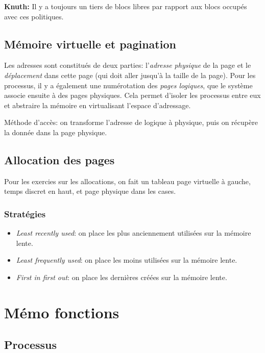 \documentclass[a4paper]{article}
\begin{document}
\begin{multicols*}{2}
    \textbf{Knuth:} Il y a toujours un tiers de blocs libres par rapport aux blocs occupés avec ces politiques.

    \subsection{Mémoire virtuelle et pagination}

    Les adresses sont constitués de deux parties: l'\emph{adresse physique} de la page et le \emph{déplacement} dans cette page (qui doit aller jusqu'à la taille de la page).
    Pour les processus, il y a également une numérotation des \emph{pages logiques}, que le système associe ensuite à des pages physiques. Cela permet d'isoler les processus entre eux et abstraire la mémoire en virtualisant l'espace d'adressage.

    Méthode d'accès: on transforme l'adresse de logique à physique, puis on récupère la donnée dans la page physique.

    \subsection{Allocation des pages}

    Pour les exercies sur les allocations, on fait un tableau page virtuelle à gauche, temps discret en haut, et page physique dans les cases.

    \subsubsection{Stratégies}
    \begin{itemize}
        \item \emph{Least recently used}: on place les plus anciennement utilisées sur la mémoire lente.
        \item \emph{Least frequently used}: on place les moins utilisées sur la mémoire lente.
        \item \emph{First in first out}: on place les dernières créées sur la mémoire lente.
    \end{itemize}

    \section{Mémo fonctions}

    \subsection{Processus}


\end{multicols*}
\end{document}
